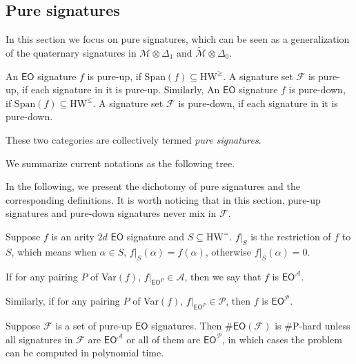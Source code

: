 \documentclass[a4paper,UKenglish,cleveref, autoref, thm-restate]{lipics-v2021}
\newcommand{\eo}[0]{\textsf{EO}}
\newcommand{\eoe}[0]{\text{HW}^=}
\newcommand{\eog}[0]{\text{HW}^\geq}
\newcommand{\eol}[0]{\text{HW}^\leq}
\newcommand{\eom}[1][\text{M}]{\textsf{EO}^{#1}}
\begin{document}
\subsection{Pure signatures}\label{purewater}

In this section we focus on pure signatures, which can be seen as a generalization of the quaternary signatures in $\mathscr{M}\otimes\Delta_1$ and $\widetilde{\mathscr{M}}\otimes\Delta_0$.

\begin{definition}\label{def:pure}
    An $\eo$ signature $f$ is pure-up, if $\text{Span}(f)\subseteq\eog$. A signature set $\mathcal{F}$ is  pure-up, if each signature in it is pure-up. Similarly, An $\eo$ signature $f$ is pure-down, if $\text{Span}(f)\subseteq\eol$. A signature set $\mathcal{F}$ is pure-down, if each signature in it is pure-down.

    These two categories are collectively termed \textit{pure signatures}.
\end{definition}
We summarize current notations as the following tree.

\begin{center}
\end{center}


 In the following, we present the dichotomy of pure signatures and the corresponding definitions. It is worth noticing that in this section, pure-up signatures and pure-down signatures never mix in $\mathcal{F}$.

\begin{definition}
  Suppose $f$ is an arity $2d$ $\eo$ signature and $S\subseteq \eoe$. $f|_{S}$ is the restriction of $f$ to $S$, which means when $\alpha\in S$, $f|_{S}(\alpha)=f(\alpha)$, otherwise $f|_{S}(\alpha)=0$.
  
  If for any pairing $P$ of Var$(f)$, $f|_{\eom[P]}\in\mathscr{A}$, then we say that $f$ is $\eom[\mathscr{A}]$.
  
  Similarly, if for any pairing $P$ of Var$(f)$, $f|_{\eom[P]} \in \mathscr{P}$, then $f$ is $\eom[\mathscr{P}]$.
  \label{def:eoaeop}
\end{definition}
\begin{theorem}[The dichotomy for pure-up $\eo$ signatures]
    Suppose $\mathcal{F}$ is a set of pure-up $\eo$ signatures. Then $\#\eo(\mathcal{F})$ is \#P-hard unless all signatures in $\mathcal{F}$ are $\eom[\mathscr{A}]$ or all of them are $\eom[\mathscr{P}]$, in which cases the problem can be computed in polynomial time.
    \label{thm:puredichotomy}
\end{theorem}
\end{document}
